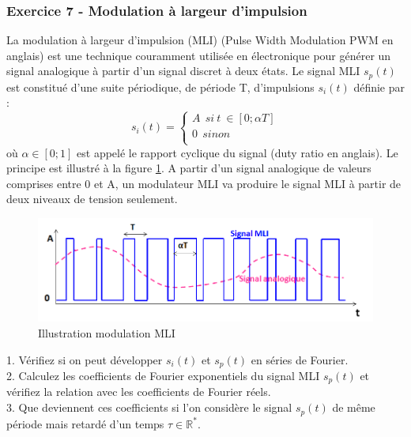	\subsubsection{Exercice 7 - Modulation à largeur d'impulsion}
	La modulation à largeur d'impulsion (MLI) (Pulse Width Modulation PWM en anglais) est une technique couramment utilisée en électronique pour générer un signal analogique à partir d'un signal discret à deux états. Le signal MLI $s_p(t)$ est constitué d'une suite périodique, de période T, d'impulsions $s_i(t)$ définie par :
	\begin{equation*}
	s_i(t)=\left \{
	\begin{array}{l}
	A~~si~t~\in[0;\alpha T] \\
	0~~sinon \\
	\end{array}
	\right .
	\end{equation*}   
	où $\alpha \in [0;1]$ est appelé le rapport cyclique du signal (duty ratio en anglais). Le principe est illustré à la figure \ref{Fig:signal_MLI}. A partir d'un signal analogique de valeurs comprises entre 0 et A, un modulateur MLI va produire le signal MLI à partir de deux niveaux de tension seulement.\\
	
	\begin{figure}[h!]
		\centering
		\includegraphics[scale=0.6]{images/signal_MLI.png}
		\caption{Illustration modulation MLI}	
		\label{Fig:signal_MLI} 
	\end{figure}
	
	1. Vérifiez si on peut développer $s_i(t)$ et $s_p(t)$ en séries de Fourier. \\
	
	2. Calculez les coefficients de Fourier exponentiels du signal MLI $s_p(t)$ et vérifiez la relation avec les coefficients de Fourier réels.\\
	
	3. Que deviennent ces coefficients si l'on considère le signal $s_p(t)$ de même période mais retardé d'un temps $\tau \in \mathbb{R^{*}}$.\\
	
